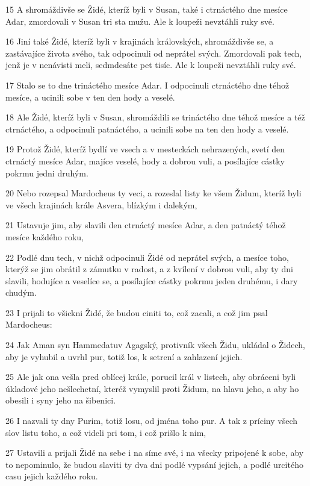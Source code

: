 \par 15 A shromáždivše se Židé, kteríž byli v Susan, také i ctrnáctého dne mesíce Adar, zmordovali v Susan tri sta mužu. Ale k loupeži nevztáhli ruky své.
\par 16 Jiní také Židé, kteríž byli v krajinách královských, shromáždivše se, a zastávajíce života svého, tak odpocinuli od neprátel svých. Zmordovali pak tech, jenž je v nenávisti meli, sedmdesáte pet tisíc. Ale k loupeži nevztáhli ruky své.
\par 17 Stalo se to dne trináctého mesíce Adar. I odpocinuli ctrnáctého dne téhož mesíce, a ucinili sobe v ten den hody a veselé.
\par 18 Ale Židé, kteríž byli v Susan, shromáždili se trináctého dne téhož mesíce a též ctrnáctého, a odpocinuli patnáctého, a ucinili sobe na ten den hody a veselé.
\par 19 Protož Židé, kteríž bydlí ve vsech a v mesteckách nehrazených, svetí den ctrnáctý mesíce Adar, majíce veselé, hody a dobrou vuli, a posílajíce cástky pokrmu jedni druhým.
\par 20 Nebo rozepsal Mardocheus ty veci, a rozeslal listy ke všem Židum, kteríž byli ve všech krajinách krále Asvera, blízkým i dalekým,
\par 21 Ustavuje jim, aby slavili den ctrnáctý mesíce Adar, a den patnáctý téhož mesíce každého roku,
\par 22 Podlé dnu tech, v nichž odpocinuli Židé od neprátel svých, a mesíce toho, kterýž se jim obrátil z zámutku v radost, a z kvílení v dobrou vuli, aby ty dni slavili, hodujíce a veselíce se, a posílajíce cástky pokrmu jeden druhému, i dary chudým.
\par 23 I prijali to všickni Židé, že budou ciniti to, což zacali, a což jim psal Mardocheus:
\par 24 Jak Aman syn Hammedatuv Agagský, protivník všech Židu, ukládal o Židech, aby je vyhubil a uvrhl pur, totiž los, k setrení a zahlazení jejich.
\par 25 Ale jak ona vešla pred oblícej krále, porucil král v listech, aby obráceni byli úkladové jeho nešlechetní, kteréž vymyslil proti Židum, na hlavu jeho, a aby ho obesili i syny jeho na šibenici.
\par 26 I nazvali ty dny Purim, totiž losu, od jména toho pur. A tak z príciny všech slov listu toho, a což videli pri tom, i což prišlo k nim,
\par 27 Ustavili a prijali Židé na sebe i na síme své, i na všecky pripojené k sobe, aby to nepominulo, že budou slaviti ty dva dni podlé vypsání jejich, a podlé urcitého casu jejich každého roku.

